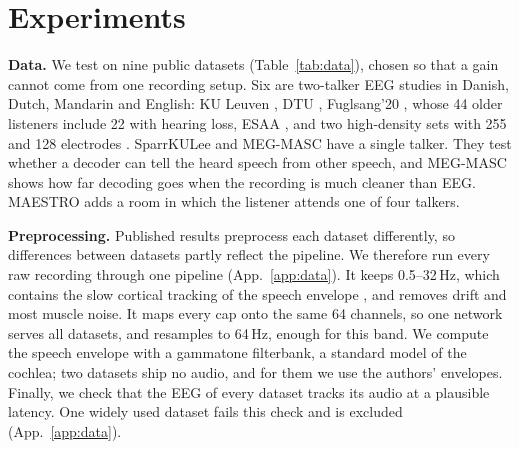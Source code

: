 \documentclass[10pt,twocolumn,letterpaper]{article}
\begin{document}
\section{Experiments}\label{sec:exp}
\textbf{Data.} We test on nine public datasets (Table~\ref{tab:data}), chosen so that a gain
cannot come from one recording setup. Six are two-talker EEG studies in Danish, Dutch,
Mandarin and English: KU Leuven \citep{das2016kul}, DTU \citep{fuglsang2017dtu}, Fuglsang'20
\citep{fuglsang2020effects}, whose 44 older listeners include 22 with hearing loss, ESAA
\citep{li2022esaa}, and two high-density sets with 255 \citep{narayanan2021uhd} and 128
electrodes \citep{broderick2018semantic}. SparrKULee \citep{accou2024sparrkulee} and MEG-MASC
\citep{gwilliams2023megmasc} have a single talker. They test whether a decoder can tell the
heard speech from other speech, and MEG-MASC shows how far decoding goes when the recording
is much cleaner than EEG. MAESTRO \citep{maestro2026} adds a room in which the listener
attends one of four talkers.

\textbf{Preprocessing.} Published results preprocess each dataset differently, so
differences between datasets partly reflect the pipeline. We therefore run every raw
recording through one pipeline (App.~\ref{app:data}). It keeps 0.5--32\,Hz, which contains the
slow cortical tracking of the speech envelope \citep{ding2012emergence}, and removes drift
and most muscle noise. It maps every cap onto the same 64 channels, so one network serves all
datasets, and resamples to 64\,Hz, enough for this band. We compute the speech envelope with
a gammatone filterbank, a standard model of the cochlea; two datasets ship no audio, and for
them we use the authors' envelopes. Finally, we check that the EEG of every dataset tracks
its audio at a plausible latency. One widely used dataset fails this check and is excluded
(App.~\ref{app:data}).
\end{document}
